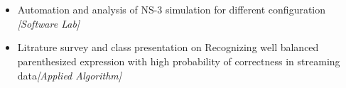 \\[-0.9cm]\\
\begin{itemize}
	\item Automation and analysis of NS-3 simulation for different configuration \hfill \emph{[Software Lab]}\\[-0.6cm]
	\item Litrature survey and class presentation on Recognizing well balanced parenthesized expression with high probability of correctness in streaming data\hfill \emph{[Applied Algorithm]} \\[-0.5cm]
\end{itemize}

